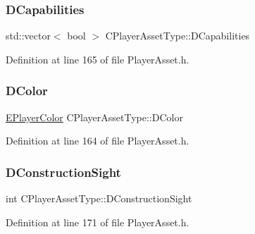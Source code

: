 \hypertarget{classCPlayerAssetType_a243f9161c56446b378dc42b51977fc58}{}\label{classCPlayerAssetType_a243f9161c56446b378dc42b51977fc58} 
\subsubsection{\texorpdfstring{D\+Capabilities}{DCapabilities}}
{\footnotesize\ttfamily std\+::vector$<$ bool $>$ C\+Player\+Asset\+Type\+::\+D\+Capabilities\hspace{0.3cm}{\ttfamily [protected]}}



Definition at line 165 of file Player\+Asset.\+h.

\hypertarget{classCPlayerAssetType_abd32b27281bcf17a611802aef148462b}{}\label{classCPlayerAssetType_abd32b27281bcf17a611802aef148462b} 
\subsubsection{\texorpdfstring{D\+Color}{DColor}}
{\footnotesize\ttfamily \hyperlink{GameDataTypes_8h_aafb0ca75933357ff28a6d7efbdd7602f}{E\+Player\+Color} C\+Player\+Asset\+Type\+::\+D\+Color\hspace{0.3cm}{\ttfamily [protected]}}



Definition at line 164 of file Player\+Asset.\+h.

\hypertarget{classCPlayerAssetType_a71b34081d4540087472af3cb9052e04a}{}\label{classCPlayerAssetType_a71b34081d4540087472af3cb9052e04a} 
\subsubsection{\texorpdfstring{D\+Construction\+Sight}{DConstructionSight}}
{\footnotesize\ttfamily int C\+Player\+Asset\+Type\+::\+D\+Construction\+Sight\hspace{0.3cm}{\ttfamily [protected]}}



Definition at line 171 of file Player\+Asset.\+h.

